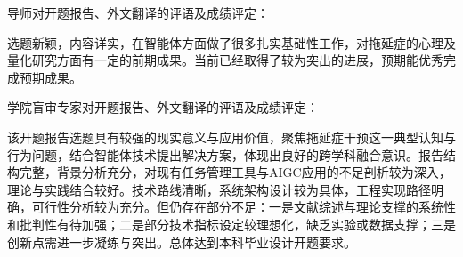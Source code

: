 \cleardoublepage{}
{
    \bfseries

    {
        \noindent 导师对开题报告、外文翻译的评语及成绩评定：
    }

    \setlength{\parindent}{2em}

    \par 选题新颖，内容详实，在智能体方面做了很多扎实基础性工作，对拖延症的心理及量化研究方面有一定的前期成果。当前已经取得了较为突出的进展，预期能优秀完成预期成果。

    \designproposaleval[14][4]
    \signature{导师签名}

    {
        \noindent 学院盲审专家对开题报告、外文翻译的评语及成绩评定：
    }

    \setlength{\parindent}{2em}

    \par 该开题报告选题具有较强的现实意义与应用价值，聚焦拖延症干预这一典型认知与行为问题，结合智能体技术提出解决方案，体现出良好的跨学科融合意识。报告结构完整，背景分析充分，对现有任务管理工具与AIGC应用的不足剖析较为深入，理论与实践结合较好。技术路线清晰，系统架构设计较为具体，工程实现路径明确，可行性分析较为充分。但仍存在部分不足：一是文献综述与理论支撑的系统性和批判性有待加强；二是部分技术指标设定较理想化，缺乏实验或数据支撑；三是创新点需进一步凝练与突出。总体达到本科毕业设计开题要求。

    \mbox{} \vfill
    \designproposaleval[13][4]
    \signature{开题报告审核负责人（签名/签章）}
}
